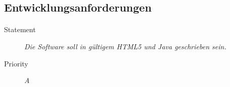 \subsection{Entwicklungsanforderungen}

\paragraph{}
\begin{description}
\item [Statement] \textit{Die Software soll in gültigem \gls{HTML5} und
    \gls{Java} geschrieben sein.}
\item [Priority] \textit{A}
\end{description}
